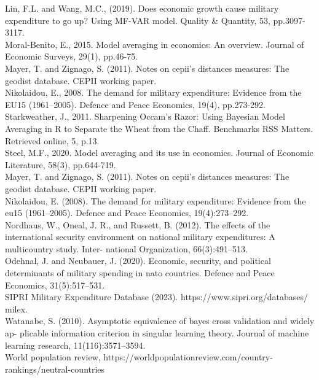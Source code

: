 \documentclass[12pt,a4paper]{article}
\begin{document}
Lin, F.L. and Wang, M.C., (2019). Does economic growth cause military expenditure to go up? Using MF-VAR model. Quality \& Quantity, 53, pp.3097-3117. \\

Moral‐Benito, E., 2015. Model averaging in economics: An overview. Journal of Economic Surveys, 29(1), pp.46-75.\\

Mayer, T. and Zignago, S. (2011). Notes on cepii’s distances measures: The geodist database. CEPII working paper.\\

Nikolaidou, E., 2008. The demand for military expenditure: Evidence from the EU15 (1961–2005). Defence and Peace Economics, 19(4), pp.273-292.\\

Starkweather, J., 2011. Sharpening Occam’s Razor: Using Bayesian Model Averaging in R to Separate the Wheat from the Chaff. Benchmarks RSS Matters. Retrieved online, 5, p.13.\\

Steel, M.F., 2020. Model averaging and its use in economics. Journal of Economic Literature, 58(3), pp.644-719.\\

Mayer, T. and Zignago, S. (2011). Notes on cepii’s distances measures: The geodist database. CEPII working paper. \\

Nikolaidou, E. (2008). The demand for military expenditure: Evidence from the eu15 (1961–2005). Defence and Peace Economics, 19(4):273–292. \\

Nordhaus, W., Oneal, J. R., and Russett, B. (2012). The effects of the international security environment on national military expenditures: A multicountry study. Inter- national Organization, 66(3):491–513. \\

Odehnal, J. and Neubauer, J. (2020). Economic, security, and political determinants of military spending in nato countries. Defence and Peace Economics, 31(5):517–531. \\

SIPRI Military Expenditure Database (2023). https://www.sipri.org/databases/ milex. \\

Watanabe, S. (2010). Asymptotic equivalence of bayes cross validation and widely ap- plicable information criterion in singular learning theory. Journal of machine learning research, 11(116):3571–3594. \\

World population review, https://worldpopulationreview.com/country-rankings/neutral-countries \\
\end{document}
